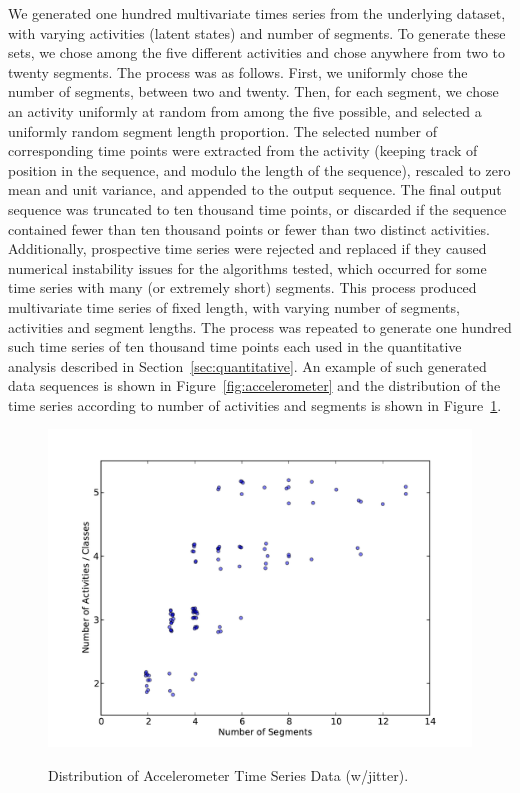 \documentclass[12pt]{article}
\begin{document}
We generated one hundred multivariate times series from the underlying dataset, with varying activities (latent states) and number of segments. To generate these sets, we chose among the five different activities and chose anywhere from two to twenty segments. The process was as follows. First, we uniformly chose the number of segments, between two and twenty. Then, for each segment, we chose an activity uniformly at random from among the five possible, and selected a uniformly random segment length proportion. The selected number of corresponding time points were extracted from the activity (keeping track of position in the sequence, and modulo the length of the sequence), rescaled to zero mean and unit variance, and appended to the output sequence. The final output sequence was truncated to ten thousand time points, or discarded if the sequence contained fewer than ten thousand points or fewer than two distinct activities. Additionally, prospective time series were rejected and replaced if they caused numerical instability issues for the algorithms tested, which occurred for some time series with many (or extremely short) segments. This process produced multivariate time series of fixed length, with varying number of segments, activities and segment lengths. The process was repeated to generate one hundred such time series of ten thousand time points each used in the quantitative analysis described in Section~\ref{sec:quantitative}. An example of such generated data sequences is shown in Figure~\ref{fig:accelerometer} and the distribution of the time series according to number of activities and segments is shown in Figure~\ref{fig:distribution}.

\begin{figure}[htbp]
    \caption{Distribution of Accelerometer Time Series Data (w/jitter).}
  \centering
    \includegraphics[width=1.\linewidth]{images/distribution_of_dataset_segments.pdf}
    \label{fig:distribution}
\end{figure}
\end{document}
